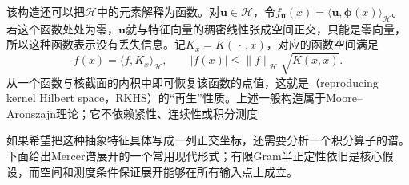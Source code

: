 该构造还可以把$\mathcal{H}$中的元素解释为函数。对$\bm{u}\in\mathcal{H}$，令$f_{\bm{u}}(x)=\langle\bm{u},\bm{\phi}(x)\rangle_{\mathcal{H}}$。若这个函数处处为零，$\bm{u}$就与特征向量的稠密线性张成空间正交，只能是零向量，所以这种函数表示没有丢失信息。记$K_x=K(\,\cdot\,,x)$，对应的函数空间满足
\[
  f(x)=\langle f,K_x\rangle_{\mathcal{H}},
  \qquad
  |f(x)|\le\lVert f\rVert_{\mathcal{H}}\sqrt{K(x,x)}.
\]
从一个函数与核截面的内积中即可恢复该函数的点值，这就是（reproducing kernel Hilbert space，RKHS）的“再生”性质。上述一般构造属于Moore--Aronszajn理论；它不依赖紧性、连续性或积分测度

如果希望把这种抽象特征具体写成一列正交坐标，还需要分析一个积分算子的谱。下面给出Mercer谱展开的一个常用现代形式；有限Gram半正定性依旧是核心假设，而空间和测度条件保证展开能够在所有输入点上成立。

